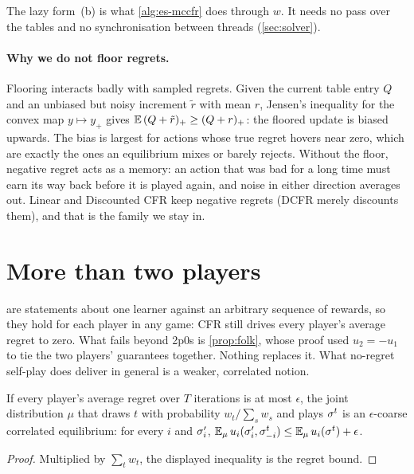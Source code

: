 The lazy form~(b) is what \cref{alg:es-mccfr} does through $w$. It needs no pass over the tables and no
synchronisation between threads (\cref{sec:solver}).

\paragraph{Why we do not floor regrets.}
Flooring interacts badly with sampled regrets. Given the current table entry $Q$ and an unbiased but noisy increment
$\tilde r$ with mean $r$, Jensen's inequality for the convex map $y \mapsto y_+$ gives $\mathbb{E}\,(Q + \tilde r)_+ \ge (Q +
r)_+$: the floored update is biased upwards. The bias is largest for actions whose true regret hovers near zero, which
are exactly the ones an equilibrium mixes or barely rejects. Without the floor, negative regret acts as a memory: an
action that was bad for a long time must earn its way back before it is played again, and noise in either direction
averages out. Linear and Discounted CFR keep negative regrets (DCFR merely discounts them), and that is the family we
stay in.

\section{More than two players}\label{sec:multiplayer}

 are statements about one learner against an arbitrary sequence of rewards, so they hold for
each player in any game: CFR still drives every player's average regret to zero. What fails beyond 2p0s is
\cref{prop:folk}, whose proof used $u_2 = -u_1$ to tie the two players' guarantees together. Nothing replaces it. What
no-regret self-play does deliver in general is a weaker, correlated notion.

\begin{proposition}\label{prop:cce}
If every player's average regret over $T$ iterations is at most $\epsilon$, the joint distribution $\mu$ that draws
$t$ with probability $w_t/\sum_s w_s$ and plays $\sigma^t$ is an $\epsilon$-coarse correlated equilibrium: for every
$i$ and $\sigma_i'$, $\mathbb{E}_{\mu}\,u_i(\sigma_i',\sigma_{-i}^t) \le \mathbb{E}_\mu\, u_i(\sigma^t) + \epsilon$.
\end{proposition}

\begin{proof}
Multiplied by $\sum_t w_t$, the displayed inequality is the regret bound.
\end{proof}

